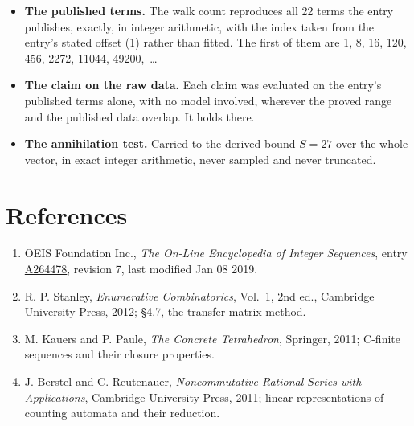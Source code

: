\documentclass[11pt]{article}
\theoremstyle{definition}
\begin{document}
\begin{itemize}

\item {\bfseries The published terms.} The walk count reproduces all 22 terms the entry publishes, exactly, in integer arithmetic, with the index taken from the entry's stated offset (1) rather than fitted. The first of them are 1, 8, 16, 120, 456, 2272, 11044, 49200,~\dots

\item {\bfseries The claim on the raw data.} Each claim was evaluated on the entry's published terms alone, with no model involved, wherever the proved range and the published data overlap. It holds there.

\item {\bfseries The annihilation test.} Carried to the derived bound $S = 27$ over the whole vector, in exact integer arithmetic, never sampled and never truncated.

\end{itemize}

\section{References}

\begin{enumerate}

\item OEIS Foundation Inc., \emph{The On-Line Encyclopedia of Integer Sequences}, entry \href{https://oeis.org/A264478}{A264478}, revision 7, last modified Jan 08 2019.

\item R. P. Stanley, \emph{Enumerative Combinatorics}, Vol.~1, 2nd ed., Cambridge University Press, 2012; \S4.7, the transfer-matrix method.

\item M. Kauers and P. Paule, \emph{The Concrete Tetrahedron}, Springer, 2011; C-finite sequences and their closure properties.

\item J. Berstel and C. Reutenauer, \emph{Noncommutative Rational Series with Applications}, Cambridge University Press, 2011; linear representations of counting automata and their reduction.

\end{enumerate}
\end{document}
